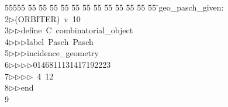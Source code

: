 %
%
\begin{tabbing}
55555 \= 55 \= 55 \= 55 \= 55 \= 55 \= 55 \= 55 \= 55 \= 55 \= 55 \= 55 \= 55 \= \>geo\_pasch\_given:\\[0pt]
2\>$\triangleright$\>(ORBITER)\ v\ 10\ \\[0pt]
3\>$\triangleright$\>$\triangleright$\>define\ C\ combinatorial\_object\ \\[0pt]
4\>$\triangleright$\>$\triangleright$\>$\triangleright$\>label\ Pasch\ Pasch\ \\[0pt]
5\>$\triangleright$\>$\triangleright$\>$\triangleright$\>incidence\_geometry\ \\[0pt]
6\>$\triangleright$\>$\triangleright$\>$\triangleright$\>$\triangleright$\>0146811131417192223\ \\[0pt]
7\>$\triangleright$\>$\triangleright$\>$\triangleright$\>$\triangleright$\ 4\ 12\ \\[0pt]
8\>$\triangleright$\>$\triangleright$\>end\\[0pt]
9\>\end{tabbing}
